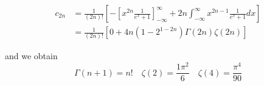 \begin{align}
  c_{2 n} & =\frac{1}{(2 n) !}\left[-\left[x^{2 n} \frac{1}{e^{x}+1}\right]_{-\infty}^{\infty}+2 n \int_{-\infty}^{\infty} x^{2 n-1} \frac{1}{e^{x}+1} d x\right]\nonumber \\ &=\frac{1}{(2 n) !}\left[0+4 n\left(1-2^{1-2 n}\right) \Gamma(2 n) \zeta(2 n)\right]
\end{align}

and we obtain
$$
  \Gamma(n+1)=n ! \quad \zeta(2)=\frac{1 \pi^{2}}{6} \quad \zeta(4)=\frac{\pi^{4}}{90}
$$
